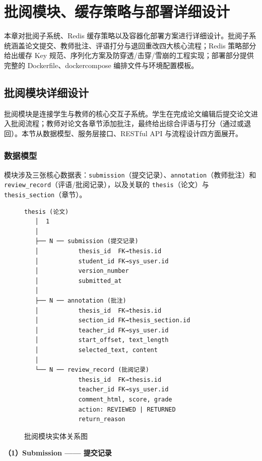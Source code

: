 \documentclass{../softeng}
\begin{document}
\section{批阅模块、缓存策略与部署详细设计}

本章对批阅子系统、Redis 缓存策略以及容器化部署方案进行详细设计。批阅子系统涵盖论文提交、教师批注、评语打分与退回重改四大核心流程；Redis 策略部分给出缓存 Key 规范、序列化方案及防穿透/击穿/雪崩的工程实现；部署部分提供完整的 Dockerfile、docker\-compose 编排文件与环境配置模板。

\subsection{批阅模块详细设计}

批阅模块是连接学生与教师的核心交互子系统。学生在完成论文编辑后提交论文进入批阅流程；教师对论文各章节添加批注，最终给出综合评语与打分（通过或退回）。本节从数据模型、服务层接口、RESTful API 与流程设计四方面展开。

\subsubsection{数据模型}

模块涉及三张核心数据表：\texttt{submission}（提交记录）、\texttt{annotation}（教师批注）和 \texttt{review\_record}（评语/批阅记录），以及关联的 \texttt{thesis}（论文）与 \texttt{thesis\_section}（章节）。

\begin{figure}[htbp]
\centering
\begin{verbatim}
thesis (论文)
   │  1
   │
   ├── N ── submission (提交记录)
   │           thesis_id  FK→thesis.id
   │           student_id FK→sys_user.id
   │           version_number
   │           submitted_at
   │
   ├── N ── annotation (批注)
   │           thesis_id  FK→thesis.id
   │           section_id FK→thesis_section.id
   │           teacher_id FK→sys_user.id
   │           start_offset, text_length
   │           selected_text, content
   │
   └── N ── review_record (批阅记录)
               thesis_id  FK→thesis.id
               teacher_id FK→sys_user.id
               comment_html, score, grade
               action: REVIEWED | RETURNED
               return_reason
\end{verbatim}
\caption{批阅模块实体关系图}
\label{fig:review-er}
\end{figure}

\textbf{（1）Submission —— 提交记录}
\end{document}
